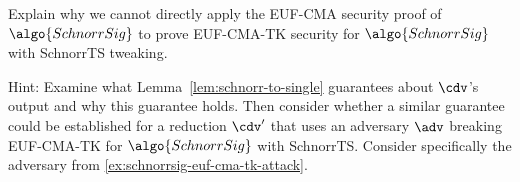 \begin{exercise}
  Explain why we cannot directly apply the EUF-CMA security proof of $\algo{SchnorrSig}$ to prove EUF-CMA-TK security for $\algo{SchnorrSig}$ with SchnorrTS tweaking.
  
  Hint: Examine what Lemma~\ref{lem:schnorr-to-single} guarantees about $\cdv$'s output and why this guarantee holds. Then consider whether a similar guarantee could be established for a reduction $\cdv'$ that uses an adversary $\adv$ breaking EUF-CMA-TK for $\algo{SchnorrSig}$ with SchnorrTS. Consider specifically the adversary from \autoref{ex:schnorrsig-euf-cma-tk-attack}.
\end{exercise}

